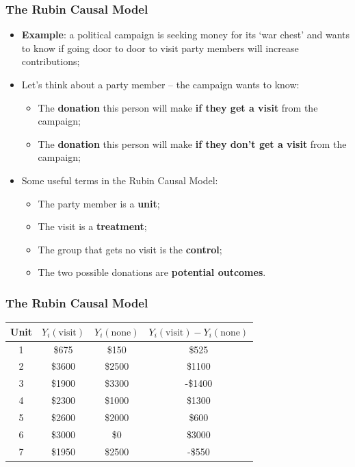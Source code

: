 \documentclass[aspectratio=169]{beamer}
\theoremstyle{principle}
\begin{document}
\begin{frame}
\frametitle{The Rubin Causal Model}
\begin{itemize}
\item \textbf{Example}: a political campaign is seeking money for its `war chest' and wants to know if going door to door to visit party members will increase contributions;
\bigskip
\item Let's think about a party member -- the campaign wants to know:
\begin{itemize}
\item The \textbf{donation} this person will make \textbf{if they get a visit} from the campaign;
\item The \textbf{donation} this person will make \textbf{if they don't get a visit} from the campaign;
\end{itemize}
\bigskip
\item Some useful terms in the Rubin Causal Model:
\begin{itemize}
\item The party member is a \textbf{unit};
\item The visit is a \textbf{treatment};
\item The group that gets no visit is the \textbf{control};
\item The two possible donations are \textbf{potential outcomes}.
\end{itemize}
\end{itemize}
\end{frame}

\begin{frame}
\frametitle{The Rubin Causal Model}
\huge
\begin{table}
\begin{tabular}{ c | c | c | c}
Unit & $Y_i(\mbox{visit})$ & $Y_i(\mbox{none})$ & \color{white}$Y_i(\mbox{visit}) - Y_i(\mbox{none})$ \\
\hline
\hline
  1 & \$675 & \$150 & \color{white}\$525 \\
  \color{white}2 & \color{white}\$3600 & \color{white}\$2500 & \color{white}\$1100\\
  \color{white}3 & \color{white}\$1900 & \color{white}\$3300 & \color{white}-\$1400\\
  \color{white}4 & \color{white}\$2300 & \color{white}\$1000 & \color{white}\$1300\\
  \color{white}5 & \color{white}\$2600 & \color{white}\$2000 & \color{white}\$600\\
  \color{white}6 & \color{white}\$3000 & \color{white}\$0 & \color{white}\$3000\\
  \color{white}7 & \color{white}\$1950 & \color{white}\$2500 & \color{white}-\$550\\
\hline
\hline
\end{tabular}
\end{table}

\end{frame}
\end{document}
